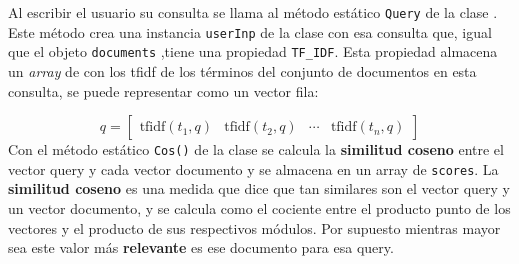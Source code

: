 \documentclass{beamer}
\begin{document}
\begin{frame}
Al escribir el usuario su consulta se llama al método estático \texttt{Query} de la clase . Este método crea una instancia \texttt{userInp} de la clase  con esa consulta que, igual que el objeto \texttt{documents} ,tiene una propiedad \texttt{TF\_IDF}. Esta propiedad almacena un \textit{array} de  con los tfidf de los términos del conjunto de documentos en esta consulta, se puede representar como un vector fila:

\begin{equation*}
q = \begin{bmatrix}
\text{tfidf}(t_1, q) & \text{tfidf}(t_2, q)& \cdots & \text{tfidf}(t_n, q)
\end{bmatrix}
\end{equation*}
Con el método estático \texttt{Cos()} de la clase  se calcula la \textbf{similitud coseno} entre el vector query y cada vector documento y se almacena en un array de  \texttt{scores}. La \textbf{similitud coseno} es una medida que dice que tan similares son el vector query y un vector documento, y se calcula como el cociente entre el producto punto de los vectores y el producto de sus respectivos módulos. Por supuesto mientras mayor sea este valor más \textbf{relevante} es ese documento para esa query. 

\end{frame}
\end{document}
